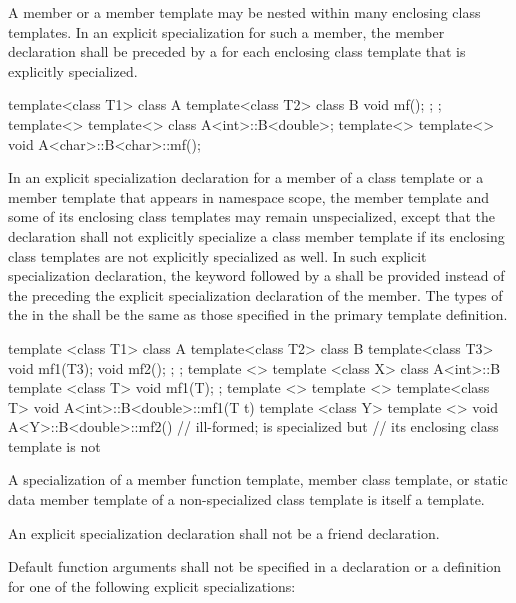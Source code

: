 \pnum
A member or a member template may be nested within many enclosing class
templates.
In an explicit specialization for such a member,
the member declaration shall be preceded by a
for each enclosing class template that is explicitly specialized.
\enterexample

\begin{codeblock}
template<class T1> class A {
  template<class T2> class B {
    void mf();
  };
};
template<> template<> class A<int>::B<double>;
template<> template<> void A<char>::B<char>::mf();
\end{codeblock}
\exitexample

\pnum
In an explicit specialization declaration for a member of a class template or
a member template that appears in namespace scope,
the member template and some of its enclosing class templates may remain
unspecialized,
except that the declaration shall not explicitly specialize a class member
template if its enclosing class templates are not explicitly specialized
as well.
In such explicit specialization declaration, the keyword
followed by a
shall be provided instead of the
preceding the explicit specialization declaration of the member.
The types of the
in the
shall be the same as those specified in the primary template definition.
\enterexample

\begin{codeblock}
template <class T1> class A {
  template<class T2> class B {
    template<class T3> void mf1(T3);
    void mf2();
  };
};
template <> template <class X>
  class A<int>::B {
      template <class T> void mf1(T);
  };
template <> template <> template<class T>
  void A<int>::B<double>::mf1(T t) { }
template <class Y> template <>
  void A<Y>::B<double>::mf2() { }       // ill-formed;  is specialized but
                                        // its enclosing class template  is not
\end{codeblock}
\exitexample

\pnum
A specialization of a member function template, member class template,
or static data member template of
a non-specialized class template is itself a template.

\pnum
An explicit specialization declaration shall not be a friend declaration.

\pnum
Default function arguments shall not be specified in a declaration or
a definition for one of the following explicit specializations:

